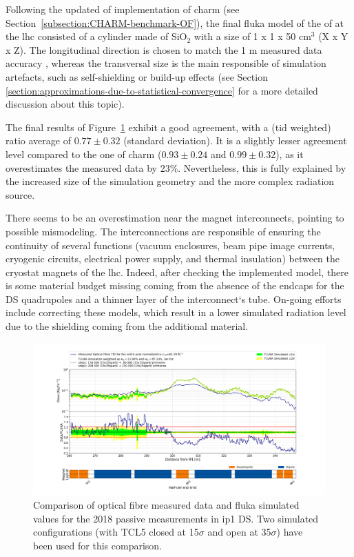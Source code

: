 \documentclass[encoding=utf8,british]{tumphthesis}
\begin{document}
Following the updated  \acrshort{of} implementation of \acrshort{charm} (see Section~\ref{subsection:CHARM-benchmark-OF}), the final \acrshort{fluka} model of the  \acrshort{of} at the \acrshort{lhc} consisted of a cylinder made of SiO$_2$ with a size of 1 x 1 x 50 cm$^3$ (X x Y x Z). The longitudinal direction is chosen to match the 1 m measured data accuracy \cite{DiFrancesca:2644042}, whereas the transversal size is the main responsible of simulation artefacts, such as self-shielding or build-up effects (see Section \ref{section:approximations-due-to-statistical-convergence} for a more detailed discussion about this topic).

The final results of Figure~\ref{fig:LHC-benchmark-OF} exhibit a good agreement, with a (\acrshort{tid} weighted) ratio average of $0.77 \pm 0.32$ (standard deviation). It is a slightly lesser agreement level compared to the one of \acrshort{charm} ($0.93\pm0.24$ and $0.99\pm0.32$), as it overestimates the measured data by 23\%. Nevertheless, this is fully explained by the increased size of the simulation geometry and the more complex radiation source. 

There seems to be an overestimation near the magnet interconnects, pointing to possible mismodeling. The interconnections are responsible of ensuring the continuity of several functions (vacuum  enclosures,  beam  pipe  image  currents, cryogenic circuits, electrical power supply, and thermal insulation)  between the cryostat magnets of the \acrshort{lhc}. Indeed, after checking the implemented model, there is some material budget missing coming from the absence of the endcaps for the DS quadrupoles and a thinner layer of the interconnect`s tube. On-going efforts include correcting these models, which result in a lower simulated radiation level due to the shielding coming from the additional material.

\begin{figure}[H]
    \centering
    \includegraphics[width=1.0\linewidth]{results/benchmark_configurations_steps_12_260_350.png}
    \caption{Comparison of optical fibre measured data and \acrshort{fluka} simulated values for the 2018 passive measurements in \acrshort{ip}1 DS. Two simulated configurations (with TCL5 closed at 15$\sigma$ and open at 35$\sigma$) have been used for this comparison.}
    \label{fig:LHC-benchmark-OF}
\end{figure}
\end{document}
